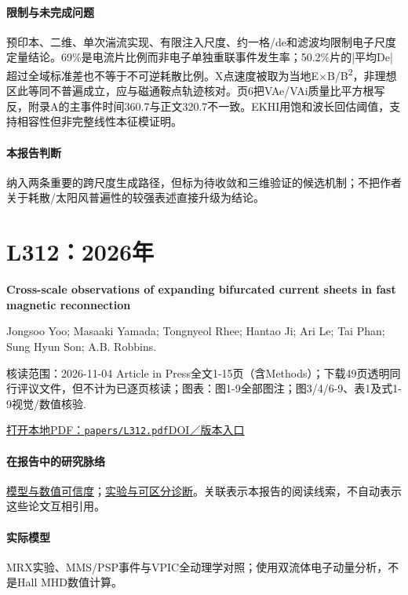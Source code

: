 \documentclass[UTF8,a4paper,11pt,openany,fontset=fandol]{ctexbook}
\begin{document}
\paragraph{限制与未完成问题}预印本、二维、单次湍流实现、有限注入尺度、约一格/de和滤波均限制电子尺度定量结论。69\%是电流片比例而非电子单独重联事件发生率；50.2\%片的|平均De|超过全域标准差也不等于不可逆耗散比例。X点速度被取为当地E×B/B\textsuperscript{2}，非理想区此等同不普遍成立，应与磁通鞍点轨迹核对。页6把VAe/VAi质量比平方根写反，附录A的主事件时间360.7与正文320.7不一致。EKHI用饱和波长回估阈值，支持相容性但非完整线性本征模证明。

\paragraph{本报告判断}纳入两条重要的跨尺度生成路径，但标为待收敛和三维验证的候选机制；不把作者关于耗散/太阳风普遍性的较强表述直接升级为结论。

\section{L312：2026年}\label{paper:L312}

\textbf{Cross-scale observations of expanding bifurcated current sheets in fast magnetic reconnection}\citep{L312}\

Jongsoo Yoo;  Masaaki Yamada;  Tongnyeol Rhee;  Hantao Ji;  Ari Le;  Tai Phan;  Sung Hyun Son;  A.B. Robbins.

\textsf{核读范围：}2026-11-04 Article in Press全文1-15页（含Methods）；下载49页透明同行评议文件，但不计为已逐页核读；\textsf{图表：}图1-9全部图注；图3/4/6-9、表1及式1-9视觉/数值核验.

\href{run:../papers/L312.pdf}{打开本地PDF：\texttt{papers/L312.pdf}}\quad\href{https://doi.org/10.1038/s41467-026-79220-2}{DOI／版本入口}

\paragraph{在报告中的研究脉络}\hyperref[V1-ch:numerics]{模型与数值可信度}；\hyperref[story:diagnostic]{实验与可区分诊断}。关联表示本报告的阅读线索，不自动表示这些论文互相引用。

\paragraph{实际模型}MRX实验、MMS/PSP事件与VPIC全动理学对照；使用双流体电子动量分析，不是Hall MHD数值计算。
\end{document}
